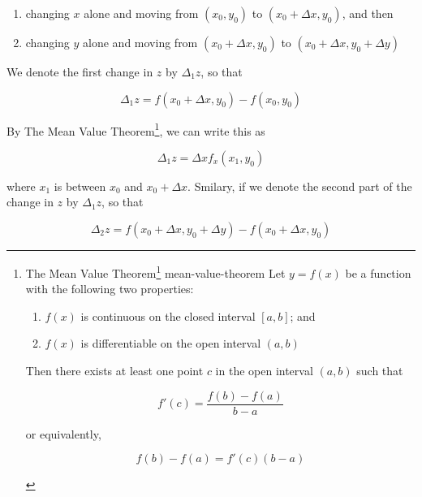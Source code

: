 \begin{enumerate}
    \item changing $x$ alone and moving from $(x_0, y_0)$ to $(x_0 + \Delta x, y_0)$, and then
    \item changing $y$ alone and moving from $(x_0 + \Delta x, y_0)$ to $(x_0 + \Delta x, y_0 + \Delta y)$
\end{enumerate}

We denote the first change in $z$ by $\Delta_1 z$, so that

\begin{equation}
    \Delta_1 z = f(x_0 + \Delta x, y_0) - f(x_0, y_0)
\end{equation}

By The Mean Value Theorem\footnote{
    \begin{Theorem}{
        The Mean Value Theorem\footnote{\href{https://trello.com/c/byu9Pyy8}{Calculus with Analytic Geometry by George F. Simmons}, p. 76}
    }{mean-value-theorem}
        Let $y = f(x)$ be a function with the following two properties:

        \begin{enumerate}
            \item $f(x)$ is continuous on the closed interval $[a, b]$; and
            \item $f(x)$ is differentiable on the open interval $(a, b)$
        \end{enumerate}

        Then there exists at least one point $c$ in the open interval $(a, b)$ such that

        \[
            f'(c) = \frac{f(b) - f(a)}{b - a}
        \]

        or equivalently,

        \[
            f(b) - f(a) = f'(c)(b - a)
        \]
    \end{Theorem}
}, we can write this as

\begin{equation}\label{eq:first-change-z-mean-val-theo}
\Delta_1 z = \Delta x f_x(x_1, y_0)
\end{equation}

where $x_1$ is between $x_0$ and $x_0 + \Delta x$. Smilary, if we denote the second part of the change in $z$ by
$\Delta_1 z$, so that

\begin{equation}
    \Delta_2 z = f(x_0 + \Delta x, y_0 + \Delta y) - f(x_0 + \Delta x, y_0)
\end{equation}

